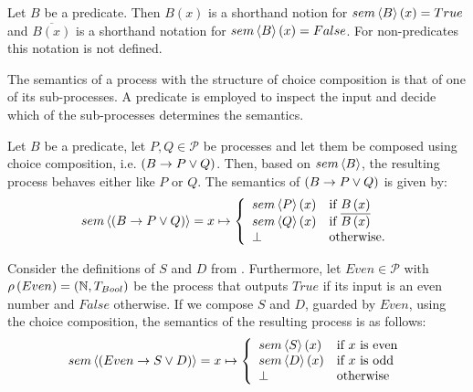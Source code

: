 \begin{definition}
Let $B$ be a predicate. Then $B \left( x \right)$ is a shorthand notion for $sem \left\langle B \right\rangle \left( x \right) = True$ and $\overline{B \left( x \right)}$ is a shorthand notation for $sem \left\langle B \right\rangle \left( x \right) = False$. For non-predicates this notation is not defined.

\hfill\qedsymbol
\end{definition}




The semantics of a process with the structure of choice composition is that of one of its sub-processes. A predicate is employed to inspect the input and decide which of the sub-processes determines the semantics.
\begin{definition}
\label{def:sem_choice}
Let $B$ be a predicate, let $P, Q \in \mathcal{P}$ be processes and let them be composed using choice composition, i.e. $\left( B \to P \vee Q \right)$. Then, based on $sem \left\langle B \right\rangle$, the resulting process behaves either like $P$ or $Q$. The semantics of $\left( B \to P \vee Q \right)$ is given by:
  \begin{equation*}
    \label{eqn:sem_choice}
    sem \left\langle \left( B \to P \vee Q \right) \right\rangle = x \mapsto \left\{ \begin{array}{ll}
      sem \left\langle P \right\rangle\left(x\right) & \text{if } B \left( x \right) \\
      sem \left\langle Q \right\rangle\left(x\right) & \text{if } \overline{B \left( x \right)} \\
      \bot & \text{otherwise}.
    \end{array}\right.
  \end{equation*}
  
  \hfill\qedsymbol
\end{definition}

\begin{example}
\label{exp:sem_chice}
Consider the definitions of $S$ and $D$ from . Furthermore, let $Even \in \mathcal{P}$ with $\rho \left( Even \right) = \left( \mathbb{N}, T_{Bool} \right)$ be the process that outputs $True$ if its input is an even number and $False$ otherwise. If we compose $S$ and $D$, guarded by $Even$, using the choice composition, the semantics of the resulting process is as follows:
  \begin{equation*}
    sem \left\langle \left( Even \to S \vee D \right) \right\rangle = x \mapsto \left\{\begin{array}{ll}
      sem \left\langle S \right\rangle\left(x\right) & \text{if } x \text{ is even} \\
      sem \left\langle D \right\rangle\left(x\right) & \text{if } x \text{ is odd} \\
      \bot & \text{otherwise}
    \end{array}\right.
  \end{equation*}
\end{example}


